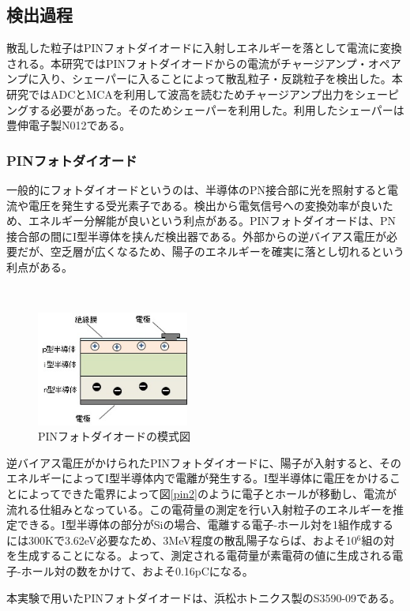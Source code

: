 \documentclass[a4paper,11pt,dvipdfmx]{jsarticle}
\begin{document}
\subsection{検出過程}
散乱した粒子はPINフォトダイオードに入射しエネルギーを落として電流に変換される。本研究ではPINフォトダイオードからの電流がチャージアンプ・オペアンプに入り、シェーパーに入ることによって散乱粒子・反跳粒子を検出した。本研究ではADCとMCAを利用して波高を読むためチャージアンプ出力をシェーピングする必要があった。そのためシェーパーを利用した。利用したシェーパーは豊伸電子製N012である。

\subsubsection{PINフォトダイオード}
一般的にフォトダイオードというのは、半導体のPN接合部に光を照射すると電流や電圧を発生する受光素子である。検出から電気信号への変換効率が良いため、エネルギー分解能が良いという利点がある。PINフォトダイオードは、PN接合部の間にI型半導体を挟んだ検出器である。外部からの逆バイアス電圧が必要だが、空乏層が広くなるため、陽子のエネルギーを確実に落とし切れるという利点がある。\cite{pin}

　\begin{figure}[H]
    \centering
    \includegraphics[width=50mm]{picture/setup/pinmoshi.png}
    \caption{PINフォトダイオードの模式図\cite{pin}}
    \label{pin1}
  \end{figure}

逆バイアス電圧がかけられたPINフォトダイオードに、陽子が入射すると、そのエネルギーによってI型半導体内で電離が発生する。I型半導体に電圧をかけることによってできた電界によって図\ref{pin2}のように電子とホールが移動し、電流が流れる仕組みとなっている。この電荷量の測定を行い入射粒子のエネルギーを推定できる。I型半導体の部分がSiの場合、電離する電子-ホール対を1組作成するには300Kで3.62eV必要なため、3MeV程度の散乱陽子ならば、およそ10$^\text{6}$組の対を生成することになる。よって、測定される電荷量が素電荷の値に生成される電子-ホール対の数をかけて、およそ0.16pCになる\cite{2019}。

\par
本実験で用いたPINフォトダイオードは、浜松ホトニクス製のS3590-09である。
\end{document}
